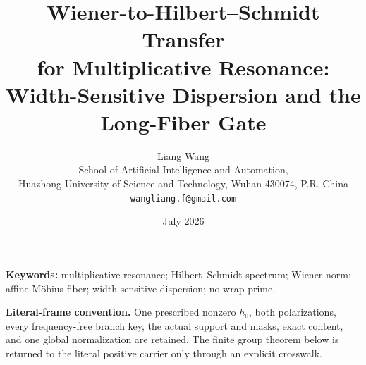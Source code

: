 \documentclass[11pt]{article}
\title{Wiener-to-Hilbert--Schmidt Transfer\\
for Multiplicative Resonance:\\
Width-Sensitive Dispersion and the Long-Fiber Gate}
\author{Liang Wang\\
School of Artificial Intelligence and Automation,\\
Huazhong University of Science and Technology, Wuhan 430074, P.R. China\\
\texttt{wangliang.f@gmail.com}}
\date{July 2026}
\theoremstyle{remark}
\begin{document}
\maketitle



\noindent\textbf{Keywords:} multiplicative resonance;
Hilbert--Schmidt spectrum; Wiener norm; affine M\"obius fiber;
width-sensitive dispersion; no-wrap prime.

\medskip
\noindent\textbf{Literal-frame convention.}
One prescribed nonzero \(h_0\), both polarizations, every
frequency-free branch key, the actual support and masks, exact
content, and one global normalization are retained.  The finite
group theorem below is returned to the literal positive carrier
only through an explicit crosswalk.











\begingroup
\footnotesize
\raggedright


\endgroup
\end{document}
